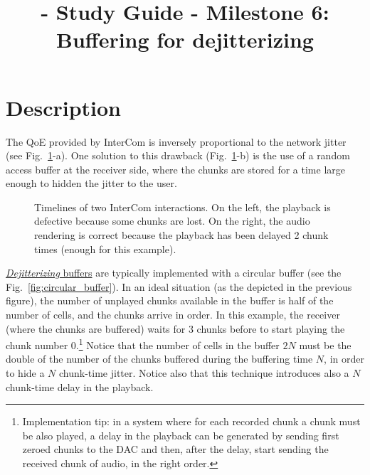 
\title{\TM - Study Guide - Milestone 6: Buffering for dejitterizing}

\maketitle

\section{Description}

The QoE provided by InterCom is inversely proportional to the network
jitter (see Fig.~\ref{fig:timelines}-a). One solution to this drawback
(Fig.~\ref{fig:timelines}-b) is the use of a random access buffer at
the receiver side, where the chunks are stored for a time large enough
to hidden the jitter to the user.

\begin{figure}
  \begin{center}
  \end{center}
  \caption{Timelines of two InterCom interactions. On the left, the
    playback is defective because some chunks are lost. On the right,
    the audio rendering is correct because the playback has been
    delayed 2 chunk times (enough for this example).}
  \label{fig:timelines}
\end{figure}

\href{https://en.wikipedia.org/wiki/Jitter#Jitter_buffers}{\emph{Dejitterizing}
  buffers} are typically implemented with a circular buffer (see the
Fig.~\ref{fig:circular_buffer}). In an ideal situation (as the
depicted in the previous figure), the number of unplayed chunks
available in the buffer is half of the number of cells, and the chunks
arrive in order. In this example, the receiver (where the chunks are
buffered) waits for 3 chunks before to start playing the chunk number
0.\footnote{Implementation tip: in a system where for each recorded
chunk a chunk must be also played, a delay in the playback can be
generated by sending first zeroed chunks to the DAC and then, after
the delay, start sending the received chunk of audio, in the right
order.} Notice that the number of cells in the buffer $2N$ must be the
double of the number of the chunks buffered during the buffering time
$N$, in order to hide a $N$ chunk-time jitter. Notice also that this
technique introduces also a $N$ chunk-time delay in the playback.


